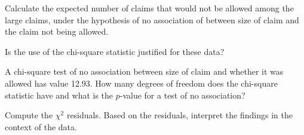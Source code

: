 {\begin{parts}
		\item Calculate the expected number of claims that would not be allowed among the large claims, under the hypothesis of no association of between size of claim and the claim not being allowed.

		\item Is the use of the chi-square statistic justified for these data?

		\item A chi-square test of no association between size of claim and whether it was allowed has value 12.93. How many degrees of freedom does the chi-square statistic have and what is the $p$-value for a test of no association?

		\item Compute the $\chi^2$ residuals. Based on the residuals, interpret the findings in the context of the data.

	\end{parts}

}{}



